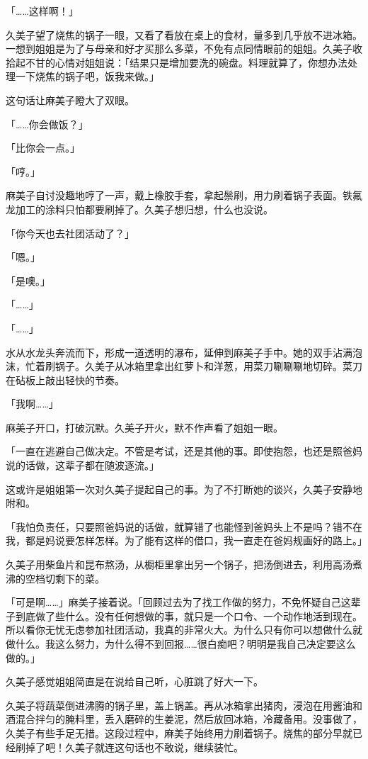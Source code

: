 \documentclass[UTF8]{ctexart}
\begin{document}
    「……这样啊！」 

    久美子望了烧焦的锅子一眼，又看了看放在桌上的食材，量多到几乎放不进冰箱。一想到姐姐是为了与母亲和好才买那么多菜，不免有点同情眼前的姐姐。久美子收拾起不甘的心情对姐姐说：「结果只是增加要洗的碗盘。料理就算了，你想办法处理一下烧焦的锅子吧，饭我来做。」 

    这句话让麻美子瞪大了双眼。 

    「……你会做饭？」 

    「比你会一点。」 

    「哼。」 

    麻美子自讨没趣地哼了一声，戴上橡胶手套，拿起鬃刷，用力刷着锅子表面。铁氟龙加工的涂料只怕都要刷掉了。久美子想归想，什么也没说。 

    「你今天也去社团活动了？」 

    「嗯。」 

    「是噢。」 

    「……」 

    「……」 

    水从水龙头奔流而下，形成一道透明的瀑布，延伸到麻美子手中。她的双手沾满泡沫，忙着刷锅子。久美子从冰箱里拿出红萝卜和洋葱，用菜刀唰唰唰地切碎。菜刀在砧板上敲出轻快的节奏。 

    「我啊……」 

    麻美子开口，打破沉默。久美子开火，默不作声看了姐姐一眼。 

    「一直在逃避自己做决定。不管是考试，还是其他的事。即使抱怨，也还是照爸妈说的话做，这辈子都在随波逐流。」 

    这或许是姐姐第一次对久美子提起自己的事。为了不打断她的谈兴，久美子安静地附和。 

    「我怕负责任，只要照爸妈说的话做，就算错了也能怪到爸妈头上不是吗？错不在我，都是妈说要怎样怎样。为了能有这样的借口，我一直走在爸妈规画好的路上。」 

    久美子用柴鱼片和昆布熬汤，从橱柜里拿出另一个锅子，把汤倒进去，利用高汤煮沸的空档切剩下的菜。 

    「可是啊……」麻美子接着说。「回顾过去为了找工作做的努力，不免怀疑自己这辈子到底做了些什么。没有任何想做的事，就只是一个口令、一个动作地活到现在。所以看你无忧无虑参加社团活动，我真的非常火大。为什么只有你可以想做什么就做什么。我这么努力，为什么得不到回报……很白痴吧？明明是我自己决定要这么做的。」 

    久美子感觉姐姐简直是在说给自己听，心脏跳了好大一下。 

    久美子将蔬菜倒进沸腾的锅子里，盖上锅盖。再从冰箱拿出猪肉，浸泡在用酱油和酒混合拌匀的腌料里，丢入磨碎的生姜泥，然后放回冰箱，冷藏备用。没事做了，久美子有些手足无措。这段过程中，麻美子始终用力刷着锅子。烧焦的部分早就已经刷掉了吧！久美子就连这句话也不敢说，继续装忙。 
\end{document}
